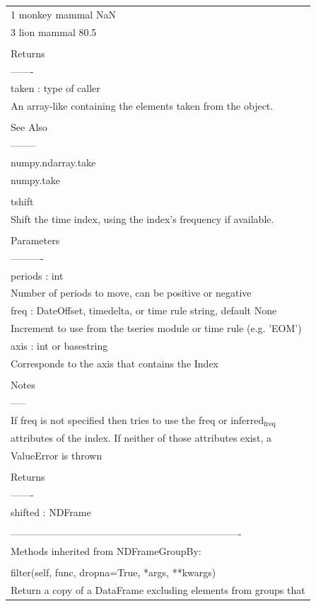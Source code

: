 \documentclass[11pt]{article}
\begin{document}
\begin{enumerate}
\begin{enumerate}
\begin{enumerate}
\begin{center}
\begin{tabular}{l}
1  monkey  mammal        NaN\\
3    lion  mammal       80.5\\
\\
Returns\\
-------\\
taken : type of caller\\
An array-like containing the elements taken from the object.\\
\\
See Also\\
--------\\
numpy.ndarray.take\\
numpy.take\\
\\
tshift\\
Shift the time index, using the index's frequency if available.\\
\\
Parameters\\
----------\\
periods : int\\
Number of periods to move, can be positive or negative\\
freq : DateOffset, timedelta, or time rule string, default None\\
Increment to use from the tseries module or time rule (e.g. 'EOM')\\
axis : int or basestring\\
Corresponds to the axis that contains the Index\\
\\
Notes\\
-----\\
If freq is not specified then tries to use the freq or inferred\(_{\text{freq}}\)\\
attributes of the index. If neither of those attributes exist, a\\
ValueError is thrown\\
\\
Returns\\
-------\\
shifted : NDFrame\\
\\
----------------------------------------------------------------------\\
Methods inherited from NDFrameGroupBy:\\
\\
filter(self, func, dropna=True, *args, **kwargs)\\
Return a copy of a DataFrame excluding elements from groups that\\

\end{tabular}
\end{center}
\end{enumerate}
\end{enumerate}
\end{enumerate}
\end{document}
